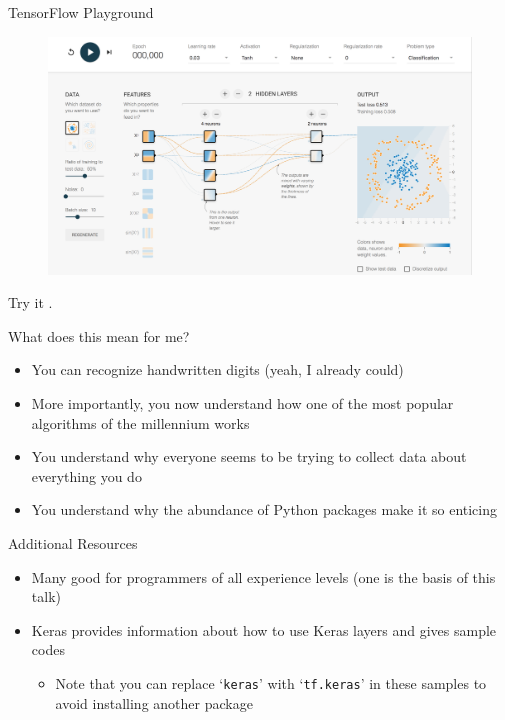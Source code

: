 \documentclass{beamer}
\newcommand{\blue}[1]{\color{blue}{#1}}
\begin{document}
	\begin{frame}{TensorFlow Playground}
		\begin{figure}
			\href{https://playground.tensorflow.org/}{\includegraphics[width=\textwidth]{playground}}
		\end{figure}
		Try it \href{https://playground.tensorflow.org/}{\blue{here}}.
	\end{frame}

	\begin{frame}{What does this mean for me?}
	\begin{itemize}
		\item You can recognize handwritten digits (yeah, I already could)
		\item More importantly, you now understand how one of the most popular algorithms of the millennium works
		\item You understand why everyone seems to be trying to collect data about everything you do
		\item You understand why the abundance of Python packages make it so enticing
	\end{itemize}
	\end{frame}

	\begin{frame}{Additional Resources}
	\begin{itemize}
		\item Many good \href{https://www.tensorflow.org/tutorials}{\blue{tutorials}} for programmers of all experience levels (one is the basis of this talk)
		\item Keras \href{https://keras.io/}{\blue{documentation}} provides information about how to use Keras layers and gives sample codes
		\begin{itemize}
			\item Note that you can replace `\lstinline|keras|' with `\lstinline|tf.keras|' in these samples to avoid installing another package
		\end{itemize}
	\end{itemize}
	\end{frame}
\end{document}
